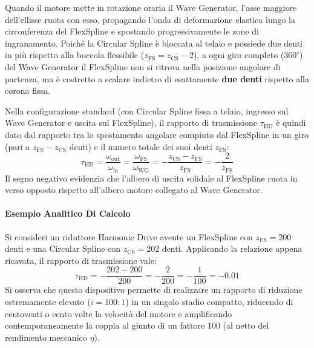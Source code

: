 ﻿\documentclass[11pt, a4paper]{article}
\begin{document}
Quando il motore mette in rotazione oraria il Wave Generator, l'asse maggiore dell'ellisse ruota con esso, propagando l'onda di deformazione elastica lungo la circonferenza del FlexSpline e spostando progressivamente le zone di ingranamento. Poiché la Circular Spline è bloccata al telaio e possiede due denti in più rispetto alla boccola flessibile ($z_{\text{FS}} = z_{\text{CS}} - 2$), a ogni giro completo ($360^\circ$) del Wave Generator il FlexSpline non si ritrova nella posizione angolare di partenza, ma è costretto a scalare indietro di esattamente \textbf{due denti} rispetto alla corona fissa.

Nella configurazione standard (con Circular Spline fissa a telaio, ingresso sul Wave Generator e uscita sul FlexSpline), il rapporto di trasmissione $\tau_{\text{HD}}$ è quindi dato dal rapporto tra lo spostamento angolare compiuto dal FlexSpline in un giro (pari a $z_{\text{FS}} - z_{\text{CS}}$ denti) e il numero totale dei suoi denti $z_{\text{FS}}$:
\[
    \boxed{\tau_{\text{HD}} = \frac{\omega_{\text{out}}}{\omega_{\text{in}}} = \frac{\omega_{\text{FS}}}{\omega_{\text{WG}}} = -\frac{z_{\text{CS}} - z_{\text{FS}}}{z_{\text{FS}}} = -\frac{2}{z_{\text{FS}}}}
    \label{eq:formula_hd}
\]
Il segno negativo evidenzia che l'albero di uscita solidale al FlexSpline ruota in verso opposto rispetto all'albero motore collegato al Wave Generator.

\paragraph{Esempio Analitico Di Calcolo}
Si consideri un riduttore Harmonic Drive avente un FlexSpline con $z_{\text{FS}} = 200$ denti e una Circular Spline con $z_{\text{CS}} = 202$ denti. Applicando la relazione appena ricavata, il rapporto di trasmissione vale:
\[
    \tau_{\text{HD}} = -\frac{202 - 200}{200} = -\frac{2}{200} = -\frac{1}{100} = -0.01
\]
Si osserva che questo dispositivo permette di realizzare un rapporto di riduzione estremamente elevato ($i = 100:1$) in un singolo stadio compatto, riducendo di centoventi o cento volte la velocità del motore e amplificando contemporaneamente la coppia al giunto di un fattore $100$ (al netto del rendimento meccanico $\eta$).
\newpage
\end{document}
